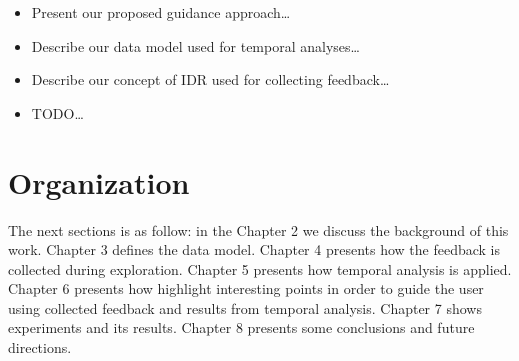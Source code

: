 \begin{itemize}
	\item Present our proposed guidance approach\ldots
	\item Describe our data model used for temporal analyses\ldots
	\item Describe our concept of IDR used for collecting feedback\ldots
	\item TODO\ldots
\end{itemize}

\section{Organization}

The next sections is as follow: in the Chapter 2 we discuss the background of this work.
Chapter 3 defines the data model.
Chapter 4 presents how the feedback is collected during exploration.
Chapter 5 presents how temporal analysis is applied.
Chapter 6 presents how highlight interesting points in order to guide the user using collected feedback and results from temporal analysis.
Chapter 7 shows experiments and its results.
Chapter 8 presents some conclusions and future directions.
